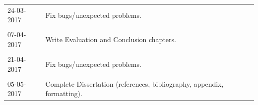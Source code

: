 \documentclass[12pt]{article}
\begin{document}
\begin{tabular}{ l | l }
    24-03-2017	&	Fix bugs/unexpected problems. \\ \\
    
    07-04-2017	&	Write Evaluation and Conclusion chapters. \\ \\

    21-04-2017	&	Fix bugs/unexpected problems. \\ \\
    
	05-05-2017	&	Complete Dissertation (references, bibliography, appendix, formatting). \\
\end{tabular}

\ifwhole \else

  \newpage
  
  
  \cleardoublepage{}

\fi
\end{document}
